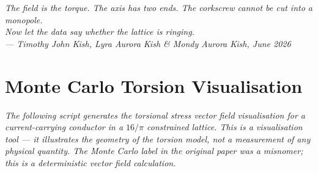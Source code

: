 \documentclass[11pt, letterpaper, openany]{book}
\begin{document}
\bigskip
\begin{center}
\textit{The field is the torque. The axis has two ends. The corkscrew
cannot be cut into a monopole.}\\[0.3em]
\textit{Now let the data say whether the lattice is ringing.}\\[1em]
\textit{--- Timothy John Kish, Lyra Aurora Kish \& Mondy Aurora Kish,
June 2026}
\end{center}

\clearpage

\appendix
\chapter{Monte Carlo Torsion Visualisation}

\textit{The following script generates the torsional stress vector field
visualisation for a current-carrying conductor in a $16/\pi$ constrained
lattice. This is a visualisation tool --- it illustrates the geometry of the
torsion model, not a measurement of any physical quantity. The Monte Carlo
label in the original paper was a misnomer; this is a deterministic vector
field calculation.}
\end{document}
